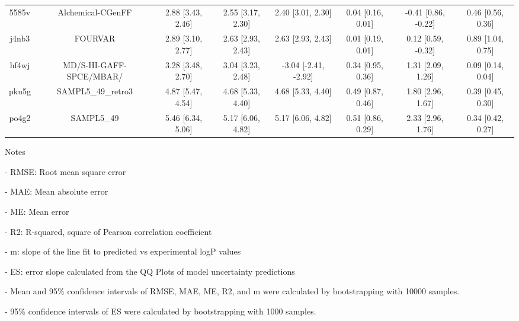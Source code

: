 \documentclass{article}
\begin{document}
\begin{center}
\begin{longtable}{|cccccccc|}
 5585v &                                  Alchemical-CGenFF &  2.88 [3.43, 2.46] &  2.55 [3.17, 2.30] &     2.40 [3.01, 2.30] &  0.04 [0.16, 0.01] &   -0.41 [0.86, -0.22] &     0.46 [0.56, 0.36] \\
 j4nb3 &                                            FOURVAR &  2.89 [3.10, 2.77] &  2.63 [2.93, 2.43] &     2.63 [2.93, 2.43] &  0.01 [0.19, 0.01] &    0.12 [0.59, -0.32] &     0.89 [1.04, 0.75] \\
 hf4wj &                            MD/S-HI-GAFF-SPCE/MBAR/ &  3.28 [3.48, 2.70] &  3.04 [3.23, 2.48] &  -3.04 [-2.41, -2.92] &  0.34 [0.95, 0.36] &     1.31 [2.09, 1.26] &     0.09 [0.14, 0.04] \\
 pku5g &                                 SAMPL5\_49\_retro3 &  4.87 [5.47, 4.54] &  4.68 [5.33, 4.40] &     4.68 [5.33, 4.40] &  0.49 [0.87, 0.46] &     1.80 [2.96, 1.67] &     0.39 [0.45, 0.30] \\
 po4g2 &                                         SAMPL5\_49 &  5.46 [6.34, 5.06] &  5.17 [6.06, 4.82] &     5.17 [6.06, 4.82] &  0.51 [0.86, 0.29] &     2.33 [2.96, 1.76] &     0.34 [0.42, 0.27] \\
\end{longtable}
\end{center}

Notes

- RMSE: Root mean square error

- MAE: Mean absolute error

- ME: Mean error

- R2: R-squared, square of Pearson correlation coefficient

- m: slope of the line fit to predicted vs experimental logP values

- ES: error slope calculated from the QQ Plots of model uncertainty predictions

- Mean and 95\% confidence intervals of RMSE, MAE, ME, R2, and m were calculated by bootstrapping with 10000 samples.

- 95\% confidence intervals of ES were calculated by bootstrapping with 1000 samples.\end{document}
\end{document}

